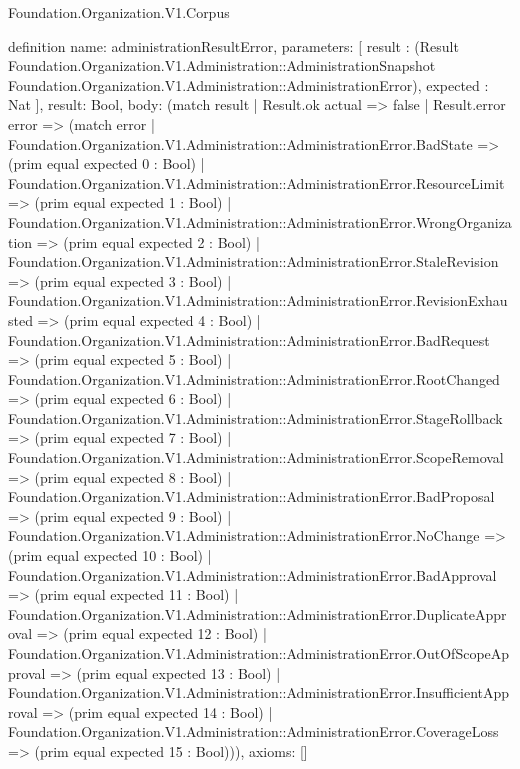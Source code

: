 \begin{lexlean}{Foundation.Organization.V1.Corpus}
\begin{semanticmodule}
definition{
  name: administrationResultError,
  parameters: [
    result : (Result Foundation.Organization.V1.Administration::AdministrationSnapshot Foundation.Organization.V1.Administration::AdministrationError),
    expected : Nat
  ],
  result: Bool,
  body: (match result
    | Result.ok actual => false
    | Result.error error => (match error
      | Foundation.Organization.V1.Administration::AdministrationError.BadState => (prim equal expected 0 : Bool)
      | Foundation.Organization.V1.Administration::AdministrationError.ResourceLimit => (prim equal expected 1 : Bool)
      | Foundation.Organization.V1.Administration::AdministrationError.WrongOrganization => (prim equal expected 2 : Bool)
      | Foundation.Organization.V1.Administration::AdministrationError.StaleRevision => (prim equal expected 3 : Bool)
      | Foundation.Organization.V1.Administration::AdministrationError.RevisionExhausted => (prim equal expected 4 : Bool)
      | Foundation.Organization.V1.Administration::AdministrationError.BadRequest => (prim equal expected 5 : Bool)
      | Foundation.Organization.V1.Administration::AdministrationError.RootChanged => (prim equal expected 6 : Bool)
      | Foundation.Organization.V1.Administration::AdministrationError.StageRollback => (prim equal expected 7 : Bool)
      | Foundation.Organization.V1.Administration::AdministrationError.ScopeRemoval => (prim equal expected 8 : Bool)
      | Foundation.Organization.V1.Administration::AdministrationError.BadProposal => (prim equal expected 9 : Bool)
      | Foundation.Organization.V1.Administration::AdministrationError.NoChange => (prim equal expected 10 : Bool)
      | Foundation.Organization.V1.Administration::AdministrationError.BadApproval => (prim equal expected 11 : Bool)
      | Foundation.Organization.V1.Administration::AdministrationError.DuplicateApproval => (prim equal expected 12 : Bool)
      | Foundation.Organization.V1.Administration::AdministrationError.OutOfScopeApproval => (prim equal expected 13 : Bool)
      | Foundation.Organization.V1.Administration::AdministrationError.InsufficientApproval => (prim equal expected 14 : Bool)
      | Foundation.Organization.V1.Administration::AdministrationError.CoverageLoss => (prim equal expected 15 : Bool))),
  axioms: []
}


\end{semanticmodule}
\end{lexlean}
